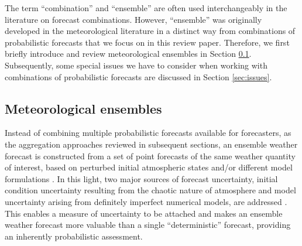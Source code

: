 \documentclass[11pt]{article}
\begin{document}

The term ``combination'' and ``ensemble'' are often used interchangeably in the literature on forecast combinations. However, ``ensemble'' was originally developed in the meteorological literature in a distinct way from combinations of probabilistic forecasts that we focus on in this review paper. Therefore, we first briefly introduce and review meteorological ensembles in Section \ref{sec:weather}. Subsequently, some special issues we have to consider when working with combinations of probabilistic forecasts are discussed in Section \ref{sec:issues}.

\subsection{Meteorological ensembles}
\label{sec:weather}

Instead of combining multiple probabilistic forecasts available for forecasters, as the aggregation approaches reviewed in subsequent sections, an ensemble weather forecast is constructed from a set of point forecasts of the same weather quantity of interest, based on perturbed initial atmospheric states \citep[e.g.,][]{Maqsood2004-pe,Gneiting2005-yn} and/or different model formulations \citep[e.g.,][]{Buizza1999-st,Buizza2005-wf}. In this light, two major sources of forecast uncertainty, initial condition uncertainty resulting from the chaotic nature of atmosphere and model uncertainty arising from definitely imperfect numerical models, are addressed \citep{Lorenz1963-yn,Weigel2008-vy,Baran2014-tm}. This enables a measure of uncertainty to be attached and makes an ensemble weather forecast more valuable than a single ``deterministic'' forecast, providing an inherently probabilistic assessment.
\end{document}
